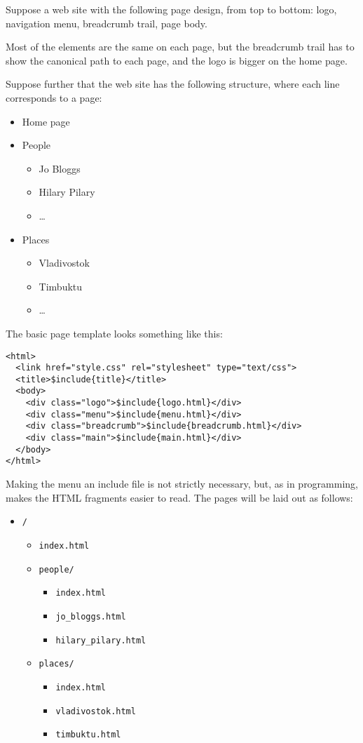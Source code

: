 \documentclass[english]{scrartcl}
\begin{document}
Suppose a web site with the following page design, from top to bottom:
logo, navigation menu, breadcrumb trail, page body.

Most of the elements are the same on each page, but the breadcrumb
trail has to show the canonical path to each page, and the logo is
bigger on the home page.

Suppose further that the web site has the following structure, where
each line corresponds to a page:

\begin{itemize}
\item Home page
\item People
  \begin{itemize}
  \item Jo Bloggs
  \item Hilary Pilary
  \item \dots
  \end{itemize}
\item Places
  \begin{itemize}
  \item Vladivostok
  \item Timbuktu
  \item \dots
  \end{itemize}
\end{itemize}

The basic page template looks something like this:

\begin{verbatim}
<html>
  <link href="style.css" rel="stylesheet" type="text/css">
  <title>$include{title}</title>
  <body>
    <div class="logo">$include{logo.html}</div>
    <div class="menu">$include{menu.html}</div>
    <div class="breadcrumb">$include{breadcrumb.html}</div>
    <div class="main">$include{main.html}</div>
  </body>
</html>
\end{verbatim}

Making the menu an include file is not strictly necessary, but, as in
programming, makes the HTML fragments easier to read. The pages will
be laid out as follows:

\begin{itemize}
\item \verb|/|
  \begin{itemize}
  \item \verb|index.html|
  \item \verb|people/|
    \begin{itemize}
    \item \verb|index.html|
    \item \verb|jo_bloggs.html|
    \item \verb|hilary_pilary.html|
    \end{itemize}
  \item \verb|places/|
    \begin{itemize}
    \item \verb|index.html|
    \item \verb|vladivostok.html|
    \item \verb|timbuktu.html|
    \end{itemize}
  \end{itemize}
\end{itemize}
\end{document}
